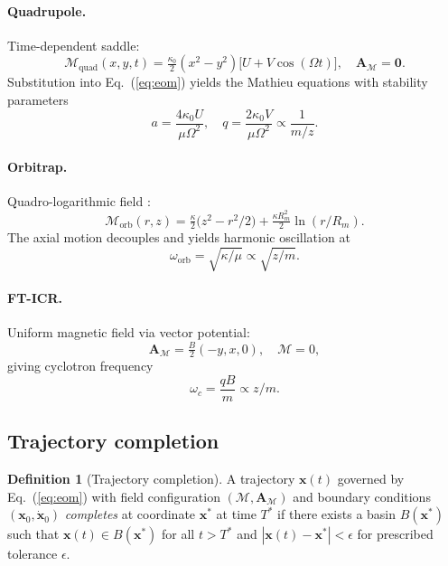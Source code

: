 \documentclass[twocolumn,11pt,a4paper]{article}
\theoremstyle{definition}
\newtheorem{definition}[theorem]{Definition}
\theoremstyle{remark}
\newcommand{\Depth}{\mathcal{M}}
\newcommand{\Apartition}{\mathbf{A}_{\mathcal{M}}}
\newcommand{\partinert}{\mu}
\begin{document}
\paragraph{Quadrupole.} Time-dependent saddle:
\begin{equation}
    \Depth_{\mathrm{quad}}(x, y, t) = \tfrac{\kappa_0}{2}(x^2 - y^2)\bigl[U + V \cos(\Omega t)\bigr], \quad \Apartition = \mathbf{0}.
\end{equation}
Substitution into Eq.~(\ref{eq:eom}) yields the Mathieu equations \citep{mathieu1868,paul1990} with stability parameters
\begin{equation}
    a = \frac{4\kappa_0 U}{\partinert \Omega^2}, \quad q = \frac{2\kappa_0 V}{\partinert \Omega^2} \propto \frac{1}{m/z}.
\end{equation}

\paragraph{Orbitrap.} Quadro-logarithmic field \citep{makarov2000,kingdon1923}:
\begin{equation}
    \Depth_{\mathrm{orb}}(r, z) = \tfrac{\kappa}{2}\bigl(z^2 - r^2/2\bigr) + \tfrac{\kappa R_m^2}{2} \ln(r/R_m).
\end{equation}
The axial motion decouples and yields harmonic oscillation at
\begin{equation}
    \omega_{\mathrm{orb}} = \sqrt{\kappa/\partinert} \propto \sqrt{z/m}.
\end{equation}

\paragraph{FT-ICR.} Uniform magnetic field via vector potential:
\begin{equation}
    \Apartition = \tfrac{B}{2}(-y, x, 0), \quad \Depth = 0,
\end{equation}
giving cyclotron frequency \citep{comisarow1974,marshall1998}
\begin{equation}
    \omega_c = \frac{qB}{m} \propto z/m.
\end{equation}

\subsection{Trajectory completion}

\begin{definition}[Trajectory completion]
\label{def:completion}
A trajectory $\mathbf{x}(t)$ governed by Eq.~(\ref{eq:eom}) with field configuration $(\Depth, \Apartition)$ and boundary conditions $(\mathbf{x}_0, \dot{\mathbf{x}}_0)$ \emph{completes} at coordinate $\mathbf{x}^\ast$ at time $T^\ast$ if there exists a basin $B(\mathbf{x}^\ast)$ such that $\mathbf{x}(t) \in B(\mathbf{x}^\ast)$ for all $t > T^\ast$ and $|\mathbf{x}(t) - \mathbf{x}^\ast| < \epsilon$ for prescribed tolerance $\epsilon$.
\end{definition}
\end{document}
